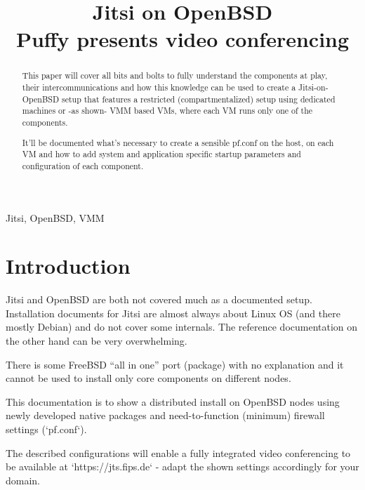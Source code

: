 \documentclass[10pt,conference]{IEEEtran}
\begin{document}
\title{Jitsi on OpenBSD\\
{\Large Puffy presents video conferencing}
}

\author{

}

\maketitle

\begin{abstract}
This paper will cover all bits and bolts to fully understand the components
at play, their intercommunications and how this knowledge can be used to create
a Jitsi-on-OpenBSD setup that features a restricted (compartmentalized) setup using
dedicated machines or -as shown- VMM based VMs, where each VM runs only one of the
components.

It'll be documented what's necessary to create a sensible pf.conf on the host, on each VM
and how to add system and application specific startup parameters and configuration of
each component.


\end{abstract}

\begin{IEEEkeywords}
Jitsi, OpenBSD, VMM
\end{IEEEkeywords}

\section{Introduction}
Jitsi and OpenBSD are both not covered much as a documented setup. Installation documents
for Jitsi are almost always about Linux OS (and there mostly Debian) and do not cover
some internals. The reference documentation on the other hand can be very overwhelming.

There is some FreeBSD ``all in one'' port (package) with no explanation and it cannot be
used to install only core components on different nodes.

This documentation is to show a distributed install on OpenBSD nodes using newly developed
native packages and need-to-function (minimum) firewall settings (`pf.conf`).

The described configurations will enable a fully integrated video conferencing
to be available at `https://jts.fips.de` - adapt the shown settings accordingly for your domain.
\end{document}
